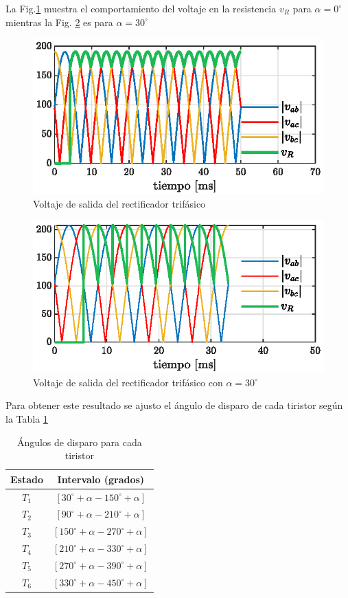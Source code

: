 \documentclass[conference]{IEEEtran}
\begin{document}
La Fig.\ref{fig:v_oi_cero} muestra el comportamiento del voltaje en la resistencia $v_R$ para $\alpha=0^\circ$
mientras la Fig. \ref{fig:v_oi_tre} es para $\alpha=30^\circ$

\begin{figure}[ht]
	\centering
	\includegraphics[scale=1]{Fig/volt_lin_R.eps}
	\caption{Voltaje de salida del rectificador trifásico}
	\label{fig:v_oi_cero}
\end{figure}

\begin{figure}[ht]
	\centering
	\includegraphics[scale=1]{Fig/volt_lin_R30.eps}
	\caption{Voltaje de salida del rectificador trifásico con $\alpha=30^\circ$}
	\label{fig:v_oi_tre}
\end{figure}
Para obtener este resultado se ajusto el ángulo de disparo de cada tiristor según la Tabla \ref{tab:angulos_disparo}
\begin{table}[h!]
	\centering
	\small
	\begin{tabular}{@{}cc@{}}
		\toprule
		Estado & Intervalo (grados) \\ \midrule
	    $T_{1}$ & $[30^\circ+\alpha - 150^\circ+\alpha]$ \\
		$T_{2}$ & $[90^\circ+\alpha - 210^\circ+\alpha]$ \\
		$T_{3}$ & $[150^\circ+\alpha -270^\circ+\alpha]$ \\
		$T_{4}$ & $[210^\circ+\alpha -330^\circ+\alpha]$ \\
		$T_{5}$ & $[270^\circ+\alpha -390^\circ+\alpha]$ \\
		$T_{6}$ & $[330^\circ+\alpha -450^\circ+\alpha]$ \\ \bottomrule
	\end{tabular}
	\caption{Ángulos de disparo para cada tiristor}
	\label{tab:angulos_disparo}
\end{table}
\end{document}
